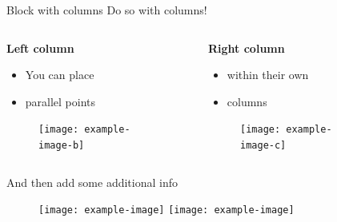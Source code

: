 \documentclass[aspectratio=1610]{beamer}
\begin{document}
\begin{frame}[fragile]{}
\begin{columns}[t]
\begin{column}{.5\linewidth}
\begin{haiblock}{Block with columns}
            Do so with columns!

            \begin{columns}[t]
                \begin{column}{0.5\linewidth}

                    \textbf{Left column}
                    \begin{itemize}
                        \item You can place
                        \item parallel points
                    \end{itemize}

                    \begin{figure}[b]
                        \centering
                        \texttt{[image: example-image-b]}%
                    \end{figure}
                \end{column}%
                \begin{column}{0.5\linewidth}

                    \textbf{Right column}
                    \begin{itemize}
                        \item within their own
                        \item columns
                    \end{itemize}

                    \begin{figure}[b]
                        \centering
                        \texttt{[image: example-image-c]}%
                    \end{figure}

                \end{column}
            \end{columns}

            \vspace{1em}

            And then add some additional info
            \begin{figure}
                \centering
                \texttt{[image: example-image]}%
                \hfill%
                \texttt{[image: example-image]}%
            \end{figure}
                
            \end{haiblock}
            
        \end{column}
        \begin{column}{.5\linewidth}
        

\end{column}
\end{columns}
\end{frame}
\end{document}

